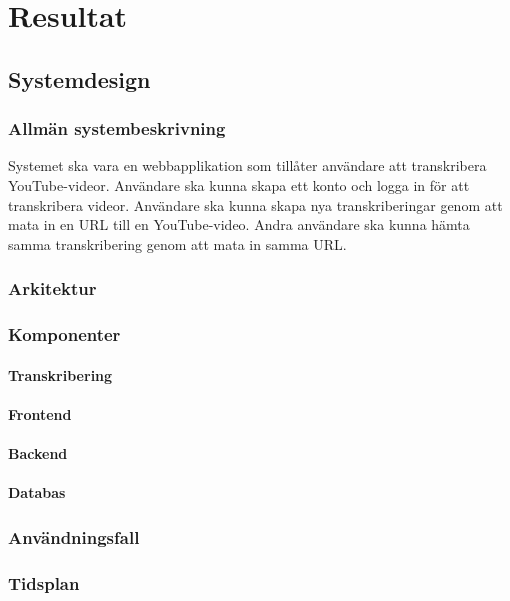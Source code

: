 \chapter{Resultat}

\section{Systemdesign}

\subsection{Allmän systembeskrivning}
Systemet ska vara en webbapplikation som tillåter användare att transkribera
YouTube-videor. Användare ska kunna skapa ett konto och logga in för att
transkribera videor. Användare ska kunna skapa nya transkriberingar genom att
mata in en URL till en YouTube-video. Andra användare ska kunna hämta samma
transkribering genom att mata in samma URL. 

\subsection{Arkitektur}

\subsection{Komponenter}

\subsubsection{Transkribering}

\subsubsection{Frontend}

\subsubsection{Backend}

\subsubsection{Databas}

\subsection{Användningsfall}

\subsection{Tidsplan}

